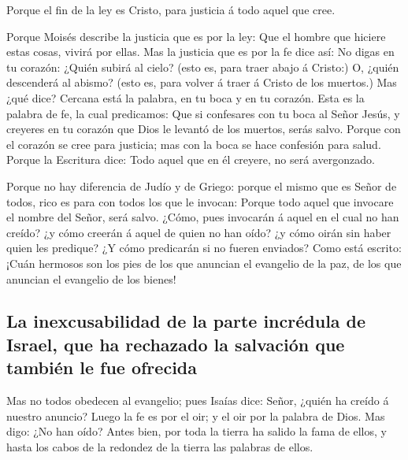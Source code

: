  Porque el fin de la ley es Cristo, para justicia á todo
aquel que cree.

 Porque Moisés describe la justicia que es por la ley: Que
el hombre que hiciere estas cosas, vivirá por ellas.  Mas
la justicia que es por la fe dice así: No digas en tu corazón: ¿Quién
subirá al cielo? (esto es, para traer abajo á Cristo:)  O,
¿quién descenderá al abismo? (esto es, para volver á traer á Cristo de
los muertos.)  Mas ¿qué dice? Cercana está la palabra, en
tu boca y en tu corazón. Esta es la palabra de fe, la cual predicamos:
 Que si confesares con tu boca al Señor Jesús, y creyeres
en tu corazón que Dios le levantó de los muertos, serás salvo.
 Porque con el corazón se cree para justicia; mas con la
boca se hace confesión para salud.  Porque la Escritura
dice: Todo aquel que en él creyere, no será avergonzado.

 Porque no hay diferencia de Judío y de Griego: porque el
mismo que es Señor de todos, rico es para con todos los que le invocan:
 Porque todo aquel que invocare el nombre del Señor, será
salvo.  ¿Cómo, pues invocarán á aquel en el cual no han
creído? ¿y cómo creerán á aquel de quien no han oído? ¿y cómo oirán sin
haber quien les predique?  ¿Y cómo predicarán si no
fueren enviados? Como está escrito: ¡Cuán hermosos son los pies de los
que anuncian el evangelio de la paz, de los que anuncian el evangelio de
los bienes!

\hypertarget{la-inexcusabilidad-de-la-parte-incruxe9dula-de-israel-que-ha-rechazado-la-salvaciuxf3n-que-tambiuxe9n-le-fue-ofrecida}{%
\subsection{La inexcusabilidad de la parte incrédula de Israel, que ha
rechazado la salvación que también le fue
ofrecida}\label{la-inexcusabilidad-de-la-parte-incruxe9dula-de-israel-que-ha-rechazado-la-salvaciuxf3n-que-tambiuxe9n-le-fue-ofrecida}}

 Mas no todos obedecen al evangelio; pues Isaías dice:
Señor, ¿quién ha creído á nuestro anuncio?  Luego la fe
es por el oir; y el oir por la palabra de Dios.  Mas
digo: ¿No han oído? Antes bien, por toda la tierra ha salido la fama de
ellos, y hasta los cabos de la redondez de la tierra las palabras de
ellos.

